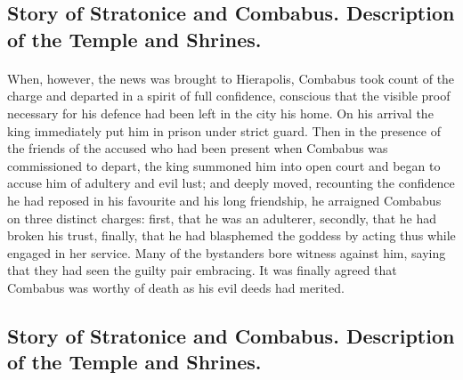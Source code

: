 \documentclass[a4paper, 11pt, oneside, polutonikogreek, english]{article}
\begin{document}
\subsection{Story of Stratonice and Combabus. Description of the Temple and Shrines.}
\paragraph{}
When, however, the news was brought to Hierapolis, Combabus took count of the charge and departed in a spirit of full confidence, conscious that the visible proof necessary for his defence had been left in the city his home. On his arrival the king immediately put him in prison under strict guard. Then in the presence of the friends of the accused who had been present when Combabus was commissioned to depart, the king summoned him into open court and began to accuse him of adultery and evil lust; and deeply moved, recounting the confidence he had reposed in his favourite and his long friendship, he arraigned Combabus on three distinct charges: first, that he was an adulterer, secondly, that he had broken his trust, finally, that he had blasphemed the goddess by acting thus while engaged in her service. Many of the bystanders bore witness against him, saying that they had seen the guilty pair embracing. It was finally agreed that Combabus was worthy of death as his evil deeds had merited.

\subsection{Story of Stratonice and Combabus. Description of the Temple and Shrines.}
\end{document}
